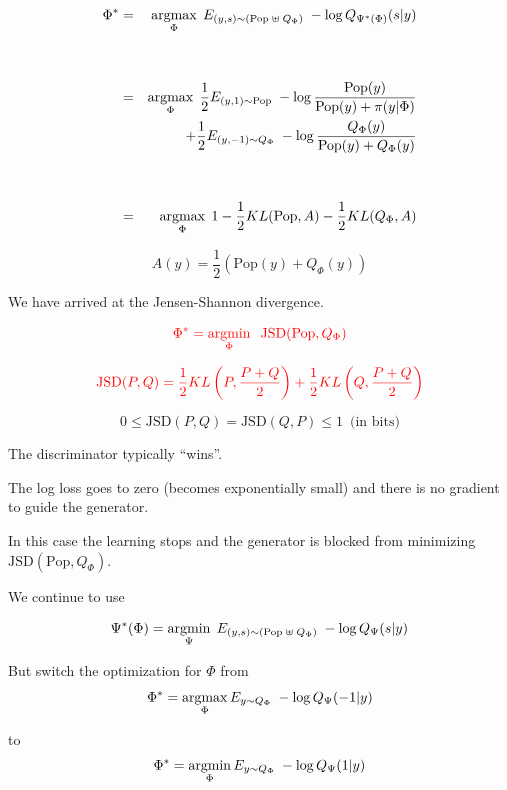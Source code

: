 {\eject

\begin{eqnarray*}
\Phi^*  & = & \operatorname*{argmax}_\Phi \; E_{(y,s) \sim (\mathrm{Pop}\; \uplus \;Q_\Phi)}\;- \log Q_{\Psi^*(\Phi)}(s|y) \\
\\
  \\
  & = & \operatorname*{argmax}_\Phi\; \frac{1}{2}  E_{(y,1) \sim \mathrm{Pop}}\;- \log \frac{\mathrm{Pop}(y)}{\mathrm{Pop}(y) + \pi(y|\Phi)} \\
  & & \;\;\;\;\;\;\; + \frac{1}{2}  E_{(y,-1) \sim Q_\Phi}\;- \log \frac{Q_\Phi(y)}{\mathrm{Pop}(y) + Q_\Phi(y)} \\
  \\
  \\
  & = & \operatorname*{argmax}_\Phi \;1 -\frac{1}{2} KL(\mathrm{Pop},A) - \frac{1}{2} KL(Q_\Phi,A)
\end{eqnarray*}

$$A(y)  =  \frac{1}{2}(\mathrm{Pop}(y) + Q_\Phi(y))$$


We have arrived at the Jensen-Shannon divergence.

$${\color{red} \Phi^* = \operatorname*{argmin}_\Phi \;\;\mathrm{JSD}(\mathrm{Pop},Q_\Phi)}$$

\vfill
$${\color{red} \mathrm{JSD}(P,Q) = \frac{1}{2} KL\left(P,\frac{P + Q}{2}\right) + \frac{1}{2} KL\left(Q, \frac{P + Q}{2}\right)}$$

\vfill
$$0 \leq \mathrm{JSD}(P,Q) = \mathrm{JSD}(Q,P) \leq 1\ \;\mbox{(in bits)}$$


The discriminator typically ``wins''.

\vfill
The log loss goes to zero (becomes exponentially small) and there is no gradient to guide the generator.

\vfill
In this case the learning stops and the generator is blocked from minimizing $\mathrm{JSD}(\mathrm{Pop},Q_\Phi)$.


We continue to use

$$\Psi^*(\Phi) = \operatorname*{argmin}_\Psi \;E_{(y,s) \sim (\mathrm{Pop}\; \uplus \;Q_\Phi)}\;- \log Q_\Psi(s|y)$$

\vfill
But switch the optimization for $\Phi$ from
$$\Phi^* = \operatorname*{argmax}_\Phi E_{y \sim Q_\Phi}\; - \log Q_\Psi(-1|y)$$

to
$$\Phi^* = \operatorname*{argmin}_\Phi E_{y \sim Q_\Phi}\;- \log Q_\Psi(1|y)$$

}
